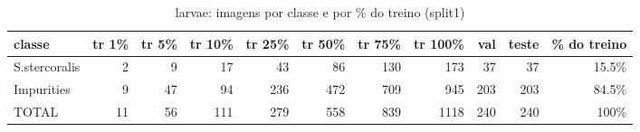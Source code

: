 \begin{table}[h]\centering\small
\caption{larvae: imagens por classe e por \% do treino (split1)}
\begin{tabular}{lrrrrrrrrrr}\toprule
classe & tr 1\% & tr 5\% & tr 10\% & tr 25\% & tr 50\% & tr 75\% & tr 100\% & val & teste & \% do treino \\\midrule
S.stercoralis & 2 & 9 & 17 & 43 & 86 & 130 & 173 & 37 & 37 & 15.5\% \\
Impurities & 9 & 47 & 94 & 236 & 472 & 709 & 945 & 203 & 203 & 84.5\% \\
\midrule TOTAL & 11 & 56 & 111 & 279 & 558 & 839 & 1118 & 240 & 240 & 100\% \\\bottomrule
\end{tabular}\end{table}
